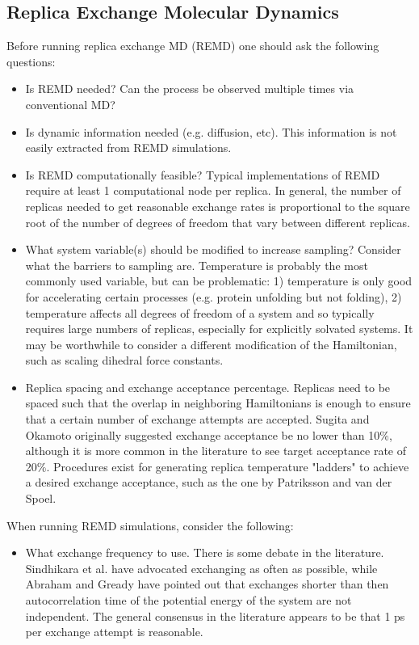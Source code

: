 \subsection{Replica Exchange Molecular Dynamics}
Before running replica exchange MD (REMD)\citep{Sugita1999} one should ask the following questions:
\begin{itemize}
  \item Is REMD needed? Can the process be observed multiple times via conventional MD?
  \item Is dynamic information needed (e.g. diffusion, etc). This information is not easily extracted from REMD simulations.
  \item Is REMD computationally feasible? Typical implementations of REMD require at least 1 computational node per replica. In general, the number of replicas needed to get reasonable exchange rates is proportional to the square root of the number of degrees of freedom that vary between different replicas.
  \item What system variable(s) should be modified to increase sampling? Consider what the barriers to sampling are. Temperature is probably the most commonly used variable, but can be problematic: 1) temperature is only good for accelerating certain processes (e.g. protein unfolding but not folding), 2) temperature affects all degrees of freedom of a system and so typically requires large numbers of replicas, especially for explicitly solvated systems. It may be worthwhile to consider a different modification of the Hamiltonian, such as scaling dihedral force constants.
  \item Replica spacing and exchange acceptance percentage. Replicas need to be spaced such that the overlap in neighboring Hamiltonians is enough to ensure that a certain number of exchange attempts are accepted. Sugita and Okamoto\citep{Sugita1999} originally suggested exchange acceptance be no lower than 10\%, although it is more common in the literature to see target acceptance rate of 20\%. Procedures exist for generating replica temperature "ladders" to achieve a desired exchange acceptance, such as the one by Patriksson and van der Spoel.\citep{Patriksson2008}
\end{itemize}

When running REMD simulations, consider the following:
\begin{itemize}
  \item What exchange frequency to use. There is some debate in the literature. Sindhikara et al. have advocated exchanging as often as possible,\citep{Sindhikara2010} while Abraham and Gready have pointed out that exchanges shorter than then autocorrelation time of the potential energy of the system are not independent.\citep{Abraham2008} The general consensus in the literature appears to be that 1 ps per exchange attempt is reasonable.
\end{itemize}

